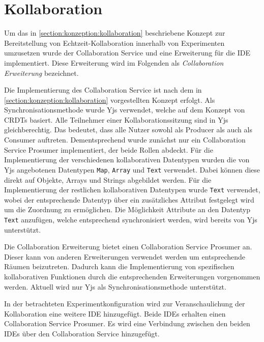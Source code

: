 \section{Kollaboration}\label{section:prototypische-implementierung:kollaboration}


Um das in \autoref{section:konzeption:kollaboration} beschriebene Konzept zur Bereitstellung von Echtzeit-Kollaboration innerhalb von Experimenten umzusetzen wurde der Collaboration Service und eine Erweiterung für die IDE implementiert. Diese Erweiterung wird im Folgenden als \textit{Collaboration Erweiterung} bezeichnet.

Die Implementierung des Collaboration Service ist nach dem in \autoref{section:konzeption:kollaboration} vorgestellten Konzept erfolgt. Als Synchronisationsmethode wurde Yjs \cite{noauthor_yjs_nodate} verwendet, welche auf dem Konzept von \acp{CRDT} basiert. Alle Teilnehmer einer Kollaborationssitzung sind in Yjs gleichberechtig. Das bedeutet, dass alle Nutzer sowohl als Producer als auch als Consumer auftreten. Dementsprechend wurde zunächst nur ein Collaboration Service Prosumer implementiert, der beide Rollen abdeckt. Für die Implementierung der verschiedenen kollaborativen Datentypen wurden die von Yjs angebotenen Datentypen \texttt{Map}, \texttt{Array} und \texttt{Text} verwendet. Dabei können diese direkt auf Objekte, Arrays und Strings abgebildet werden. Für die Implementierung der restlichen kollaborativen Datentypen wurde \texttt{Text} verwendet, wobei der entsprechende Datentyp über ein zusätzliches Attribut festgelegt wird um die Zuordnung zu ermöglichen. Die Möglichkeit Attribute an den Datentyp \texttt{Text} anzufügen, welche entsprechend synchronisiert werden, wird bereits von Yjs unterstützt.

Die Collaboration Erweiterung bietet einen Collaboration Service Prosumer an. Dieser kann von anderen Erweiterungen verwendet werden um entsprechende Räumen beizutreten. Dadurch kann die Implementierung von spezifischen kollaborativen Funktionen durch die entsprechenden Erweiterungen vorgenommen werden. Aktuell wird nur Yjs als Synchronisationsmethode unterstützt.

In der betrachteten Experimentkonfiguration wird zur Veranschaulichung der Kollaboration eine weitere IDE hinzugefügt. Beide IDEs erhalten einen Collaboration Service Prosumer. Es wird eine Verbindung zwischen den beiden IDEs über den Collaboration Service hinzugefügt.